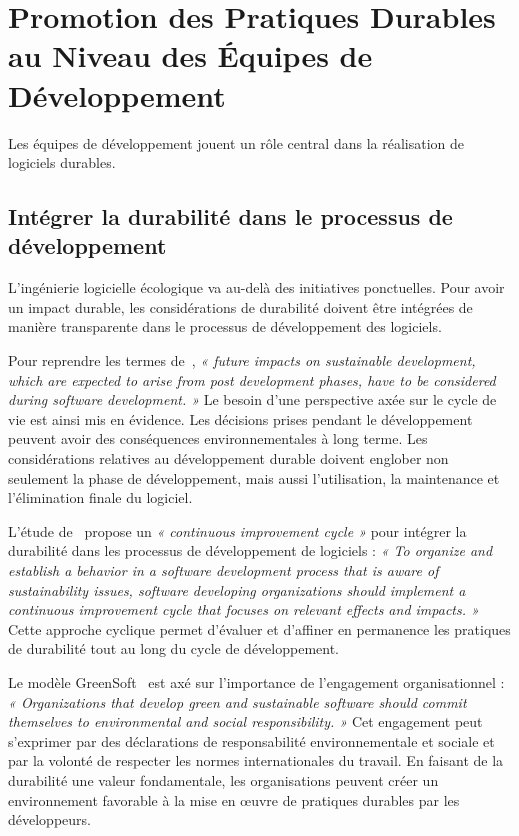 
\section{Promotion des Pratiques Durables au Niveau des Équipes de Développement}
\label{sec:pratiques-equipe}


Les équipes de développement jouent un rôle central dans la réalisation de logiciels durables.

\subsection{Intégrer la durabilité dans le processus de développement}
L'ingénierie logicielle écologique va au-delà des initiatives ponctuelles. Pour avoir un impact durable, les considérations de durabilité doivent être intégrées de manière transparente dans le processus de développement des logiciels.


Pour reprendre les termes de~\cite{GreenAgileMethods}, \emph{« future impacts on sustainable development, which are expected to arise from post development phases, have to be considered during software development. »} Le besoin d'une perspective axée sur le cycle de vie est ainsi mis en évidence.  Les décisions prises pendant le développement peuvent avoir des conséquences environnementales à long terme. Les considérations relatives au développement durable doivent englober non seulement la phase de développement, mais aussi l'utilisation, la maintenance et l'élimination finale du logiciel.


L'étude de~\cite{GreenAgileMethods} propose un \emph{« continuous improvement cycle »} pour intégrer la durabilité dans les processus de développement de logiciels : \emph{« To organize and establish a behavior in a software development process that is aware of sustainability issues, software developing organizations should implement a continuous improvement cycle that focuses on relevant effects and impacts. »} Cette approche cyclique permet d'évaluer et d'affiner en permanence les pratiques de durabilité tout au long du cycle de développement.


Le modèle GreenSoft~\cite{GreenSoftModel} est axé sur l'importance de l'engagement organisationnel : \emph{« Organizations that develop green and sustainable software should commit themselves to environmental and social responsibility. »} Cet engagement peut s'exprimer par des déclarations de responsabilité environnementale et sociale et par la volonté de respecter les normes internationales du travail. En faisant de la durabilité une valeur fondamentale, les organisations peuvent créer un environnement favorable à la mise en œuvre de pratiques durables par les développeurs.


